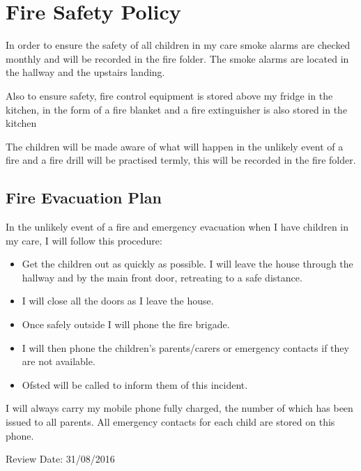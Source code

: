 
\section{Fire Safety Policy}

In order to ensure the safety of all children in my care smoke alarms
are checked monthly and will be recorded in the fire folder. The smoke
alarms are located in the hallway and the upstairs landing.

Also to ensure safety, fire control equipment is stored above my fridge
in the kitchen, in the form of a fire blanket and a fire extinguisher is
also stored in the kitchen

The children will be made aware of what will happen in the unlikely
event of a fire and a fire drill will be practised termly, this
will be recorded in the fire folder.

\subsection{Fire Evacuation Plan}

In the unlikely event of a fire and emergency evacuation when I have
children in my care, I will follow this procedure:

\begin{itemize}
\item
  Get the children out as quickly as possible. I will leave the house
  through the hallway and by the main front door, retreating to a safe
  distance.
\item
  I will close all the doors as I leave the house.
\item
  Once safely outside I will phone the fire brigade.
\item
  I will then phone the children's parents/carers or emergency contacts
  if they are not available.
\item
  Ofsted will be called to inform them of this incident.
\end{itemize}

I will always carry my mobile phone fully charged, the number of which
has been issued to all parents. All emergency contacts for each child are
stored on this phone.

Review Date: 31/08/2016


